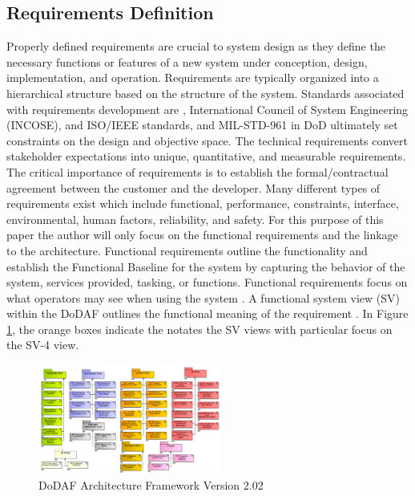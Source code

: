 \documentclass[num-refs]{wiley-article}
\begin{document}
\subsection{Requirements Definition}
\label{Requirements Definition}

Properly defined requirements are crucial to system design as they define the necessary functions or features of a new system under conception, design, implementation, and operation. Requirements are typically organized into a hierarchical structure based on the structure of the system. Standards associated with requirements development are \cite{NASAHandbook2016}, International Council of System Engineering (INCOSE), and ISO/IEEE standards, and MIL-STD-961 \cite{MIL-STD-961E_2003} in DoD ultimately set constraints on the design and objective space. The technical requirements convert stakeholder expectations into unique, quantitative, and measurable requirements. The critical importance of requirements is to establish the formal/contractual agreement between the customer and the developer. Many different types of requirements exist which include functional, performance, constraints, interface, environmental, human factors, reliability, and safety. For this purpose of this paper the author will only focus on the functional requirements and the linkage to the architecture. Functional requirements outline the functionality and establish the Functional Baseline for the system by capturing the behavior of the system, services provided, tasking, or functions. Functional requirements focus on what operators may see when using the system \cite{ChiefInformationOfficer2010}. A functional system view (SV) within the DoDAF outlines the functional meaning of the requirement \cite{ChiefInformationOfficer2010}. In Figure \ref{fig2}, the orange boxes indicate the notates the SV views with particular focus on the SV-4 view.

\begin{figure}
\centering
\includegraphics[width=6cm]{Images/Capture.png}
\caption{DoDAF Architecture Framework Version 2.02 \cite{Stroud2016}}
\label{fig2}
\end{figure}
\end{document}

